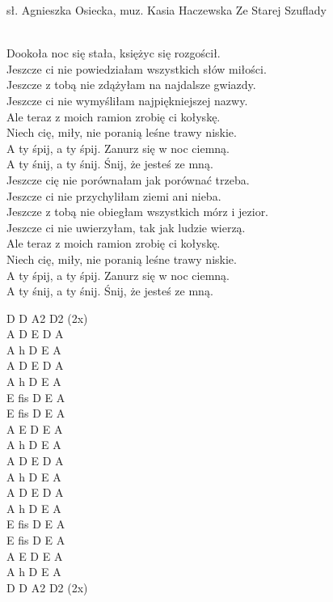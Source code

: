 {sł. Agnieszka Osiecka, muz. Kasia Haczewska}
{Ze Starej Szuflady}
\begin{text}
\vin \\
Dookoła noc się stała, księżyc się rozgościł.\\
Jeszcze ci nie powiedziałam wszystkich słów miłości.\\
Jeszcze z tobą nie zdążyłam na najdalsze gwiazdy.\\
Jeszcze ci nie wymyśliłam najpiękniejszej nazwy.\\

\vin Ale teraz z moich ramion zrobię ci kołyskę.\\
\vin Niech cię, miły, nie poranią leśne trawy niskie.\\

\vin A ty śpij, a ty śpij. Zanurz się w noc ciemną.\\
\vin A ty śnij, a ty śnij. Śnij, że jesteś ze mną.\\

Jeszcze cię nie porównałam jak porównać trzeba.\\
Jeszcze ci nie przychyliłam ziemi ani nieba.\\
Jeszcze z tobą nie obiegłam wszystkich mórz i jezior.\\
Jeszcze ci nie uwierzyłam, tak jak ludzie wierzą.\\

\vin Ale teraz z moich ramion zrobię ci kołyskę.\\
\vin Niech cię, miły, nie poranią leśne trawy niskie.\\

\vin A ty śpij, a ty śpij. Zanurz się w noc ciemną.\\
\vin A ty śnij, a ty śnij. Śnij, że jesteś ze mną.\\
\end{text}
\begin{chord}
D D A2 D2 (2x)\\
A D E D A\\
A h D E A\\
A D E D A\\
A h D E A\\

E fis D E A\\
E fis D E A\\

A E D E A \\
A h D E A \\

A D E D A\\
A h D E A\\
A D E D A\\
A h D E A\\

E fis D E A\\
E fis D E A\\

A E D E A \\
A h D E A \\
D D A2 D2 (2x)\\
\end{chord}

